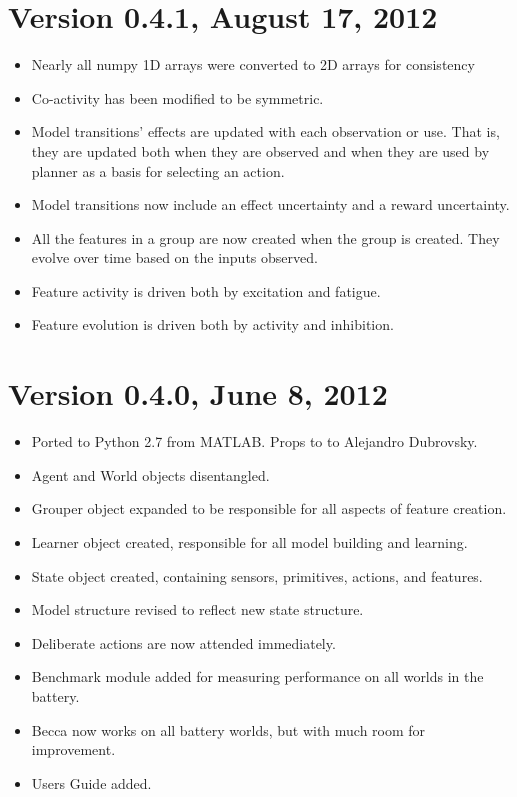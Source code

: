 \section*{Version 0.4.1, August 17, 2012}

\begin{itemize}
\item Nearly all numpy 1D arrays were converted to 2D arrays for consistency   
\item Co-activity has been modified to be symmetric.
\item Model transitions' effects are updated with each observation or use. That is, they are updated both when they are observed and when they are used by planner as a basis for selecting an action.
\item Model transitions now include an effect uncertainty and a reward uncertainty. 
\item All the features in a group are now created when the group is created. They evolve over time based on the inputs observed.
\item Feature activity is driven both by excitation and fatigue.
\item Feature evolution is driven both by activity and inhibition.
\end{itemize}


\section*{Version 0.4.0, June 8, 2012}

\begin{itemize}
\item Ported to Python 2.7 from MATLAB. Props to to Alejandro Dubrovsky.
\item Agent and World objects disentangled.
\item Grouper object expanded to be responsible for all aspects of feature creation.
\item Learner object created, responsible for all model building and learning.
\item State object created, containing sensors, primitives, actions, and features.
\item Model structure revised to reflect new state structure.
\item Deliberate actions are now attended immediately.
\item Benchmark module added for measuring performance on all worlds in the battery.
\item Becca now works on all battery worlds, but with much room for improvement.
\item Users Guide added. 
\end{itemize}

